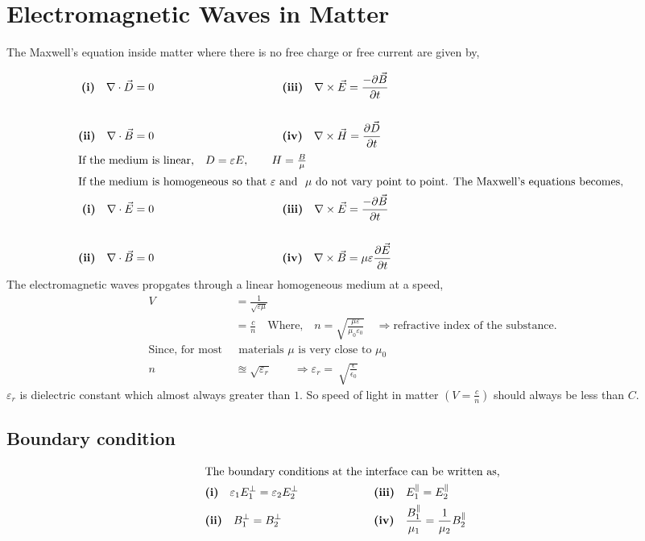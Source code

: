 \section{Electromagnetic Waves in Matter}
The Maxwell's equation inside matter where there is no free charge or free current are given by,

\begin{align*}
\textbf{(i)}\quad \nabla\cdot \vec{D}=0&\hspace{4cm}\textbf{(iii)} \quad\nabla\times \vec{E}=\frac{-\partial \vec{B}}{\partial t}\\\\
\textbf{(ii)}\quad\nabla\cdot \vec{B}=0&\hspace{4cm}\textbf{(iv)}\quad\nabla\times \vec{H}=\frac{\partial \vec{D}}{\partial t}\\
\intertext{If the medium is linear,\quad $ D=\varepsilon E,\qquad H=\frac{B}{\mu} $}
\intertext{If the medium is homogeneous so that $ \varepsilon $\ and \ $ \mu$\ do not vary point to point. The Maxwell's equations becomes, }
\textbf{(i)}\quad \nabla\cdot \vec{E}=0&\hspace{4cm}\textbf{(iii)} \quad\nabla\times \vec{E}=\frac{-\partial \vec{B}}{\partial t}\\\\
\textbf{(ii)}\quad\nabla\cdot \vec{B}=0&\hspace{4cm}\textbf{(iv)}\quad\nabla\times \vec{B}= \mu \varepsilon\frac{\partial \vec{E}}{\partial t}
\end{align*}
The electromagnetic waves propgates through a linear homogeneous medium at a speed,
\begin{align*}
V&=\frac{1}{\sqrt{\varepsilon\mu}}\\
&=\frac{c}{n}\quad\text{Where,}\quad n= \sqrt{\frac{\mu \varepsilon}{\mu_0 \varepsilon_0}} \quad \Rightarrow \text{refractive index of the substance.}\\
\text{Since, for most   }&\text{ materials \ $\mu$ is very close to  $\mu_{0}$} \\
n& \approxeq \sqrt{\varepsilon_r}\qquad \Rightarrow \varepsilon_r= \ \sqrt{\frac{\epsilon}{\epsilon_{0}}}
\end{align*}
$\varepsilon_r$ is dielectric constant which almost always greater than $1$. So speed of light in matter $(V=\frac{c}{n})$ should always be less than $C$.\\
\subsection{Boundary condition}\label{boundary condition1}
\begin{align*}
\intertext{The boundary conditions at the interface can be written as,}
&\textbf{(i)}\quad\varepsilon_1E^\perp_1=  \varepsilon_2E^\perp_2 \hspace{2cm}  &&\textbf{(iii)}\quad E^\parallel_1= E^\parallel_2\\
&\textbf{(ii)}\quad B^\perp_1= B^\perp_2
\hspace{2cm}  &&\textbf{(iv)}\quad \frac{B^\parallel_1}{\mu_{1}}=  \frac{1}{\mu_{2}}B^\parallel_2
\end{align*}

